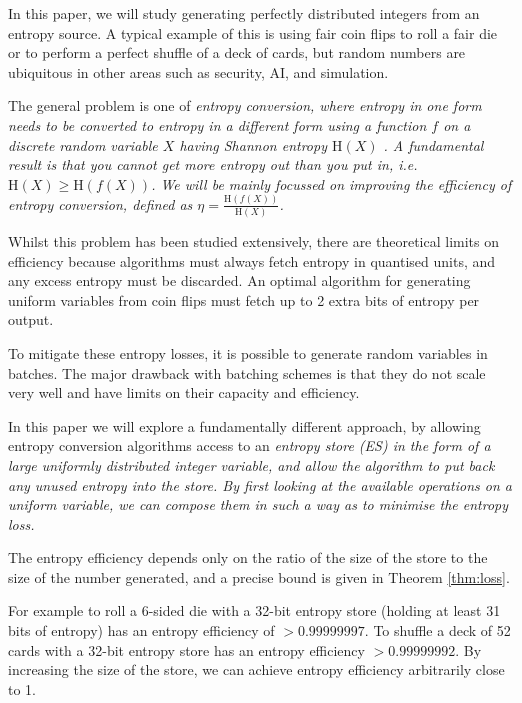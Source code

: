 \documentclass[lettersize,onecolumn]{IEEEtran}
\newcommand{\entropy}[1]{\mathrm{H}(#1)}
\begin{document}
In this paper, we will study generating perfectly distributed integers from an entropy source. A typical example of this is using fair coin flips to roll a fair die or to perform a perfect shuffle of a deck of cards, but random numbers are ubiquitous in other areas such as security, AI, and simulation.

The general problem is one of \em entropy conversion\em, where entropy in one form needs to be converted to entropy in a different form using a function $f$ on a discrete random variable $X$ having Shannon entropy $\entropy{X}$
\cite{shannon1948mathematical}.  
A fundamental result is that you cannot get more entropy out than you put in, i.e. $\entropy{X} \ge \entropy{f(X)}$. \cite{cover1999elements} 
We will be mainly focussed on improving the \em efficiency \em of entropy conversion, defined as $\eta = \frac{\entropy{f(X)}}{\entropy{X}}$.

Whilst this problem has been studied extensively, there are theoretical limits on efficiency because algorithms must always fetch entropy in quantised units, and any excess entropy must be discarded. An optimal algorithm for generating uniform variables from coin flips must fetch up to 2 extra bits of entropy per output.  \cite{cover1999elements, Knuth1976TheCO}

To mitigate these entropy losses, it is possible to generate random variables in batches. The major drawback with batching schemes is that they do not scale very well and have limits on their capacity and efficiency.

In this paper we will explore a fundamentally different approach, by allowing entropy conversion algorithms access to an \em entropy store \em (ES) in the form of a large uniformly distributed integer variable, and allow the algorithm to put back any unused entropy into the store. By first looking at the available operations on a uniform variable, we can compose them in such a way as to minimise the entropy loss.

The entropy efficiency depends only on the ratio of the size of the store to the size of the number generated, and a precise bound is given in Theorem \ref{thm:loss}. 

For example to roll a 6-sided die with a 32-bit entropy store (holding at least 31 bits of entropy) has an entropy efficiency of $>0.99999997$. To shuffle a deck of 52 cards with a 32-bit entropy store has an entropy efficiency $>0.99999992$. By increasing the size of the store, we can achieve entropy efficiency arbitrarily close to 1.
\end{document}
